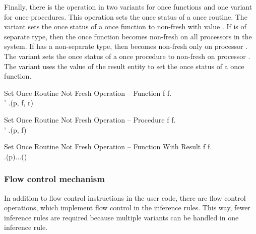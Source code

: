 Finally, there is the  operation in two variants for once functions and one variant for once procedures. This operation sets the once status of a once routine. The variant  sets the once status of a once function  to non-fresh with value . If  is of separate type, then the once function becomes non-fresh on all processors in the system. If  has a non-separate type, then  becomes non-fresh only on processor . The variant  sets the once status of a once procedure  to non-fresh on processor . The variant  uses the value of the result entity to set the once status of a once function.

\singlelineinferencerule
	{Set Once Routine Not Fresh Operation -- Function}
	{
		f \in \functiontype \wedge f.\isonceroutinefeature \\
		\state' \mathematicaldefinition \state.\setoncefunctionnotfreshfeature(p, f, r)
	}
	{}
	{}

\singlelineinferencerule
	{Set Once Routine Not Fresh Operation -- Procedure}
	{
		f \in \proceduretype \wedge f.\isonceroutinefeature \\
		\state' \mathematicaldefinition \state.\setonceprocedurenotfreshfeature(p, f)
	}
	{}
	{}

\inferencerule
	{Set Once Routine Not Fresh Operation -- Function With Result}
	{
		f \in \functiontype \wedge f.\isonceroutinefeature \\
		\state.\environmentsfeature(p).\topfeature.\namesfeature.\containsfeature(\resultentityname) \\
	}
	{}
	{}
 
\subsubsection{Flow control mechanism}
In addition to flow control instructions in the user code, there are flow control operations, which implement flow control in the inference rules. This way, fewer inference rules are required because multiple variants can be handled in one inference rule.


